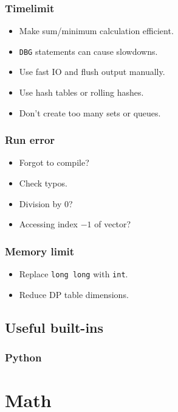 \subsubsection{Timelimit}
\begin{itemize}
    \item Make sum/minimum calculation efficient.
    \item \texttt{DBG} statements can cause slowdowns.
    \item Use fast IO and flush output manually.
    \item Use hash tables or rolling hashes.
    \item Don't create too many sets or queues.
\end{itemize}

\subsubsection{Run error}
\begin{itemize}
    \item Forgot to compile?
    \item Check typos.
    \item Division by $0$?
    \item Accessing index $-1$ of vector?
\end{itemize}

\subsubsection{Memory limit}
\begin{itemize}
    \item Replace \texttt{long long} with \texttt{int}.
    \item Reduce DP table dimensions.
\end{itemize}



\subsection{Useful built-ins}


\subsubsection{Python}





\section{Math}

